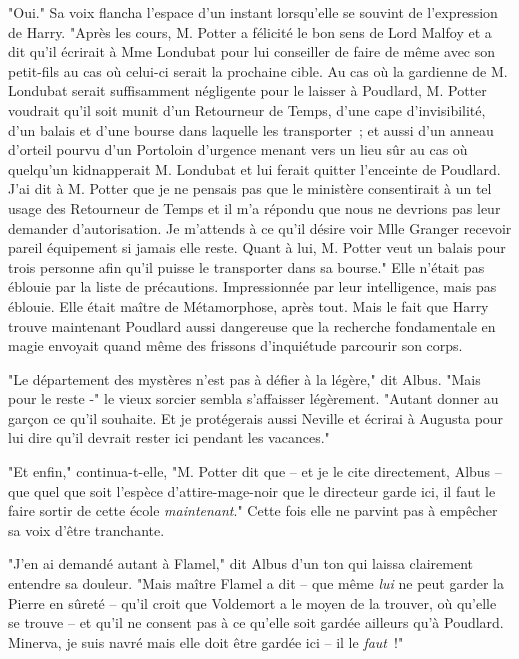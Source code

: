 "Oui." Sa voix flancha l'espace d'un instant lorsqu'elle se souvint de l'expression de Harry. "Après les cours, M. Potter a félicité le bon sens de Lord Malfoy et a dit qu'il écrirait à Mme Londubat pour lui conseiller de faire de même avec son petit-fils au cas où celui-ci serait la prochaine cible. Au cas où la gardienne de M. Londubat serait suffisamment négligente pour le laisser à Poudlard, M. Potter voudrait qu'il soit munit d'un Retourneur de Temps, d'une cape d'invisibilité, d'un balais et d'une bourse dans laquelle les transporter~; et aussi d'un anneau d'orteil pourvu d'un Portoloin d'urgence menant vers un lieu sûr au cas où quelqu'un kidnapperait M. Londubat et lui ferait quitter l'enceinte de Poudlard. J'ai dit à M. Potter que je ne pensais pas que le ministère consentirait à un tel usage des Retourneur de Temps et il m'a répondu que nous ne devrions pas leur demander d'autorisation. Je m'attends à ce qu'il désire voir Mlle Granger recevoir pareil équipement si jamais elle reste. Quant à lui, M. Potter veut un balais pour trois personne afin qu'il puisse le transporter dans sa bourse." Elle n'était pas éblouie par la liste de précautions. Impressionnée par leur intelligence, mais pas éblouie. Elle était maître de Métamorphose, après tout. Mais le fait que Harry trouve maintenant Poudlard aussi dangereuse que la recherche fondamentale en magie envoyait quand même des frissons d'inquiétude parcourir son corps.

"Le département des mystères n'est pas à défier à la légère," dit Albus. "Mais pour le reste -" le vieux sorcier sembla s'affaisser légèrement. "Autant donner au garçon ce qu'il souhaite. Et je protégerais aussi Neville et écrirai à Augusta pour lui dire qu'il devrait rester ici pendant les vacances."

"Et enfin," continua-t-elle, "M. Potter dit que -- et je le cite directement, Albus -- que quel que soit l'espèce d'attire-mage-noir que le directeur garde ici, il faut le faire sortir de cette école \emph{maintenant}." Cette fois elle ne parvint pas à empêcher sa voix d'être tranchante.

"J'en ai demandé autant à Flamel," dit Albus d'un ton qui laissa clairement entendre sa douleur. "Mais maître Flamel a dit -- que même \emph{lui} ne peut garder la Pierre en sûreté -- qu'il croit que Voldemort a le moyen de la trouver, où qu'elle se trouve -- et qu'il ne consent pas à ce qu'elle soit gardée ailleurs qu'à Poudlard. Minerva, je suis navré mais elle doit être gardée ici -- il le \emph{faut}~!"

